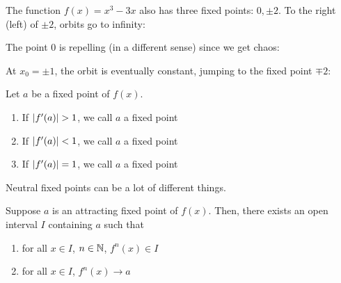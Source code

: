 \documentclass[class=pmath370,tikz,notes]{agony}
\begin{document}
\begin{example}
  The function $f(x) = x^3 - 3x$ also has three fixed points: $0, \pm2$.
  To the right (left) of $\pm 2$, orbits go to infinity:
  \begin{center}
    \quad
  \end{center}
  The point 0 is repelling (in a different sense) since we get chaos:
  \begin{center}
    \quad
  \end{center}
  At $x_0 = \pm 1$, the orbit is eventually constant, jumping to the fixed point $\mp 2$:
  \begin{center}
    \quad
  \end{center}
\end{example}

\begin{defn}
  Let $a$ be a fixed point of $f(x)$.
  \begin{enumerate}[noitemsep]
    \item If $\abs{f'(a)} > 1$, we call $a$ a  fixed point
    \item If $\abs{f'(a)} < 1$, we call $a$ a  fixed point
    \item If $\abs{f'(a)} = 1$, we call $a$ a  fixed point
  \end{enumerate}
  Neutral fixed points can be a lot of different things.
\end{defn}

\begin{theorem}\label{thm:afp}
  Suppose $a$ is an attracting fixed point of $f(x)$.
  Then, there exists an open interval $I$ containing $a$ such that
  \begin{enumerate}[noitemsep]
    \item for all $x \in I$, $n \in \mathbb{N}$, $f^n(x) \in I$
    \item for all $x \in I$, $f^n(x) \to a$
  \end{enumerate}
\end{theorem}
\end{document}
